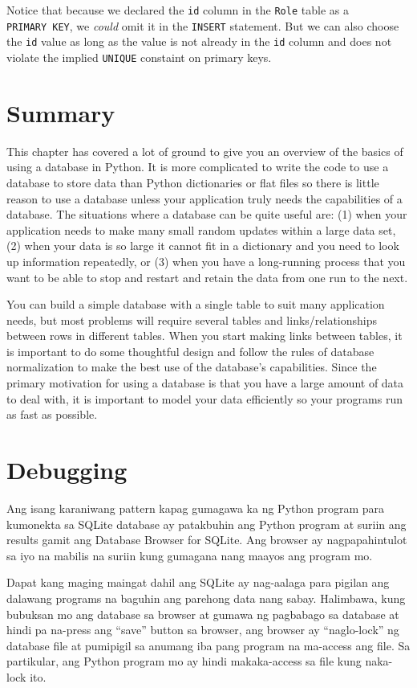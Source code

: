\documentclass[10pt,]{book}
\begin{document}
Notice that because we declared the \texttt{id} column in the
\texttt{Role} table as a \texttt{PRIMARY\ KEY}, we \emph{could} omit it
in the \texttt{INSERT} statement. But we can also choose the \texttt{id}
value as long as the value is not already in the \texttt{id} column and
does not violate the implied \texttt{UNIQUE} constaint on primary keys.

\section{Summary}\label{summary-2}

This chapter has covered a lot of ground to give you an overview of the
basics of using a database in Python. It is more complicated to write
the code to use a database to store data than Python dictionaries or
flat files so there is little reason to use a database unless your
application truly needs the capabilities of a database. The situations
where a database can be quite useful are: (1) when your application
needs to make many small random updates within a large data set, (2)
when your data is so large it cannot fit in a dictionary and you need to
look up information repeatedly, or (3) when you have a long-running
process that you want to be able to stop and restart and retain the data
from one run to the next.

You can build a simple database with a single table to suit many
application needs, but most problems will require several tables and
links/relationships between rows in different tables. When you start
making links between tables, it is important to do some thoughtful
design and follow the rules of database normalization to make the best
use of the database's capabilities. Since the primary motivation for
using a database is that you have a large amount of data to deal with,
it is important to model your data efficiently so your programs run as
fast as possible.

\section{Debugging}\label{debugging-11}

Ang isang karaniwang pattern kapag gumagawa ka ng Python program para
kumonekta sa SQLite database ay patakbuhin ang Python program at suriin
ang results gamit ang Database Browser for SQLite. Ang browser ay
nagpapahintulot sa iyo na mabilis na suriin kung gumagana nang maayos
ang program mo.

Dapat kang maging maingat dahil ang SQLite ay nag-aalaga para pigilan
ang dalawang programs na baguhin ang parehong data nang sabay.
Halimbawa, kung bubuksan mo ang database sa browser at gumawa ng
pagbabago sa database at hindi pa na-press ang ``save'' button sa
browser, ang browser ay ``naglo-lock'' ng database file at pumipigil sa
anumang iba pang program na ma-access ang file. Sa partikular, ang
Python program mo ay hindi makaka-access sa file kung naka-lock ito.
\end{document}
